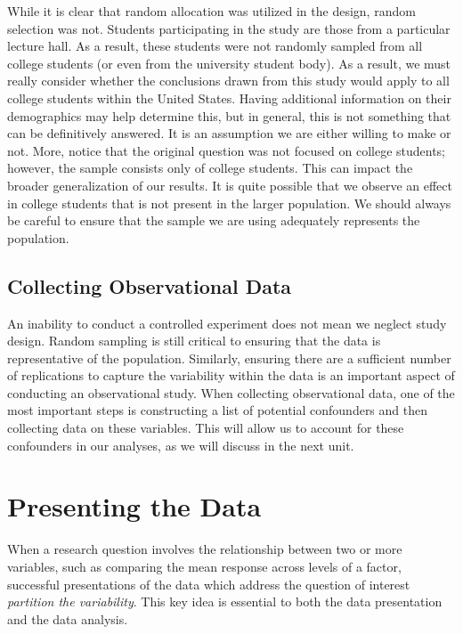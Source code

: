 \documentclass[]{book}
\theoremstyle{definition}
\theoremstyle{definition}
\theoremstyle{definition}
\theoremstyle{remark}
\begin{document}
While it is clear that random allocation was utilized in the design,
random selection was not. Students participating in the study are those
from a particular lecture hall. As a result, these students were not
randomly sampled from all college students (or even from the university
student body). As a result, we must really consider whether the
conclusions drawn from this study would apply to all college students
within the United States. Having additional information on their
demographics may help determine this, but in general, this is not
something that can be definitively answered. It is an assumption we are
either willing to make or not. More, notice that the original question
was not focused on college students; however, the sample consists only
of college students. This can impact the broader generalization of our
results. It is quite possible that we observe an effect in college
students that is not present in the larger population. We should always
be careful to ensure that the sample we are using adequately represents
the population.

\section{Collecting Observational
Data}\label{collecting-observational-data}

An inability to conduct a controlled experiment does not mean we neglect
study design. Random sampling is still critical to ensuring that the
data is representative of the population. Similarly, ensuring there are
a sufficient number of replications to capture the variability within
the data is an important aspect of conducting an observational study.
When collecting observational data, one of the most important steps is
constructing a list of potential confounders and then collecting data on
these variables. This will allow us to account for these confounders in
our analyses, as we will discuss in the next unit.

\chapter{Presenting the Data}\label{ANOVAsummaries}

When a research question involves the relationship between two or more
variables, such as comparing the mean response across levels of a
factor, successful presentations of the data which address the question
of interest \emph{partition the variability}. This key idea is essential
to both the data presentation and the data analysis.
\end{document}
